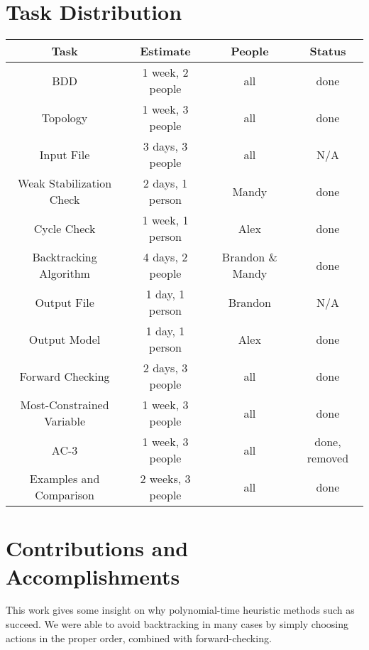 \section{Task Distribution}

\begin{center}
\begin{tabular}{|c||c|c|c|}
\hline
 Task & Estimate & People & Status \\
\hline
 BDD & 1 week, 2 people & all & done \\
 Topology & 1 week, 3 people & all & done \\
 Input File & 3 days, 3 people & all & N/A \\
 Weak Stabilization Check & 2 days, 1 person & Mandy & done \\
 Cycle Check & 1 week, 1 person & Alex & done \\
 Backtracking Algorithm & 4 days, 2 people & Brandon \& Mandy & done \\
 Output File & 1 day, 1 person &  Brandon & N/A \\
 Output Model & 1 day, 1 person & Alex & done \\
 Forward Checking & 2 days, 3 people & all & done \\
 Most-Constrained Variable & 1 week, 3 people & all & done \\
 AC-3 & 1 week, 3 people & all & done, removed \\
 Examples and Comparison & 2 weeks, 3 people & all & done \\
\hline
\end{tabular}
\end{center}

\section{Contributions and Accomplishments}

This work gives some insight on why polynomial-time heuristic methods such as \cite{ipdpsEbnenasir11} succeed.
We were able to avoid backtracking in many cases by simply choosing actions in the proper order, combined with forward-checking.

